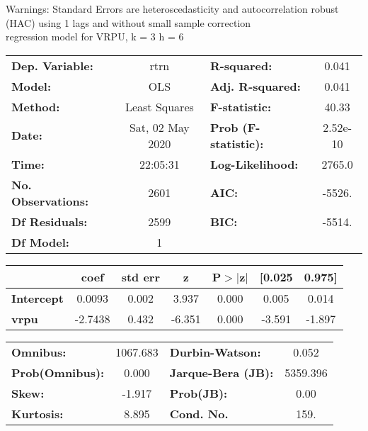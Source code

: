 Warnings: \newline
 [1] Standard Errors are heteroscedasticity and autocorrelation robust (HAC) using 1 lags and without small sample correction\\ 

regression model for VRPU, k = 3 h = 6\begin{center}
\begin{tabular}{lclc}
\toprule
\textbf{Dep. Variable:}    &       rtrn       & \textbf{  R-squared:         } &     0.041   \\
\textbf{Model:}            &       OLS        & \textbf{  Adj. R-squared:    } &     0.041   \\
\textbf{Method:}           &  Least Squares   & \textbf{  F-statistic:       } &     40.33   \\
\textbf{Date:}             & Sat, 02 May 2020 & \textbf{  Prob (F-statistic):} &  2.52e-10   \\
\textbf{Time:}             &     22:05:31     & \textbf{  Log-Likelihood:    } &    2765.0   \\
\textbf{No. Observations:} &        2601      & \textbf{  AIC:               } &    -5526.   \\
\textbf{Df Residuals:}     &        2599      & \textbf{  BIC:               } &    -5514.   \\
\textbf{Df Model:}         &           1      & \textbf{                     } &             \\
\bottomrule
\end{tabular}
\begin{tabular}{lcccccc}
                   & \textbf{coef} & \textbf{std err} & \textbf{z} & \textbf{P$> |$z$|$} & \textbf{[0.025} & \textbf{0.975]}  \\
\midrule
\textbf{Intercept} &       0.0093  &        0.002     &     3.937  &         0.000        &        0.005    &        0.014     \\
\textbf{vrpu}      &      -2.7438  &        0.432     &    -6.351  &         0.000        &       -3.591    &       -1.897     \\
\bottomrule
\end{tabular}
\begin{tabular}{lclc}
\textbf{Omnibus:}       & 1067.683 & \textbf{  Durbin-Watson:     } &    0.052  \\
\textbf{Prob(Omnibus):} &   0.000  & \textbf{  Jarque-Bera (JB):  } & 5359.396  \\
\textbf{Skew:}          &  -1.917  & \textbf{  Prob(JB):          } &     0.00  \\
\textbf{Kurtosis:}      &   8.895  & \textbf{  Cond. No.          } &     159.  \\
\bottomrule
\end{tabular}
\end{center}

